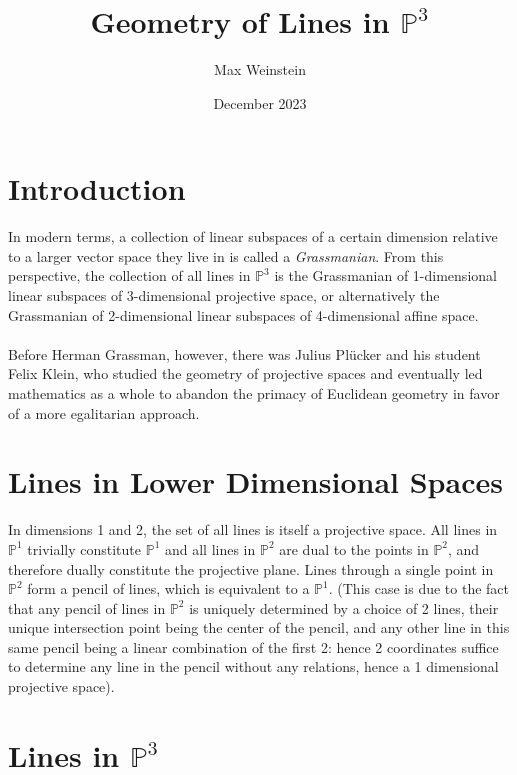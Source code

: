 \documentclass{article}
\title{Geometry of Lines in $\mathbb{P}^3$}
\author{Max Weinstein}
\date{December 2023}
\begin{document}
\maketitle

\section{Introduction}

In modern terms, a collection of linear subspaces of a certain dimension relative to a larger vector space they live in is called a \textit{Grassmanian}. From this perspective, the collection of all lines in $\mathbb{P}^3$ is the Grassmanian of 1-dimensional linear subspaces of 3-dimensional projective space, or alternatively the Grassmanian of 2-dimensional linear subspaces of 4-dimensional affine space. \\
\\
Before Herman Grassman, however, there was Julius Pl\"ucker and his student Felix Klein, who studied the geometry of projective spaces and eventually led mathematics as a whole to abandon the primacy of Euclidean geometry in favor of a more egalitarian approach.

\section{Lines in Lower Dimensional Spaces}

In dimensions 1 and 2, the set of all lines is itself a projective space. All lines in $\mathbb{P}^1$ trivially constitute $\mathbb{P}^1$ and all lines in $\mathbb{P}^2$ are dual to the points in $\mathbb{P}^2$, and therefore dually constitute the projective plane. Lines through a single point in $\mathbb{P}^2$ form a pencil of lines, which is equivalent to a $\mathbb{P}^1$. (This case is due to the fact that any pencil of lines in $\mathbb{P}^2$ is uniquely determined by a choice of 2 lines, their unique intersection point being the center of the pencil, and any other line in this same pencil being a linear combination of the first 2: hence 2 coordinates suffice to determine any line in the pencil without any relations, hence a 1 dimensional projective space).

\section{Lines in $\mathbb{P}^3$}
\end{document}
